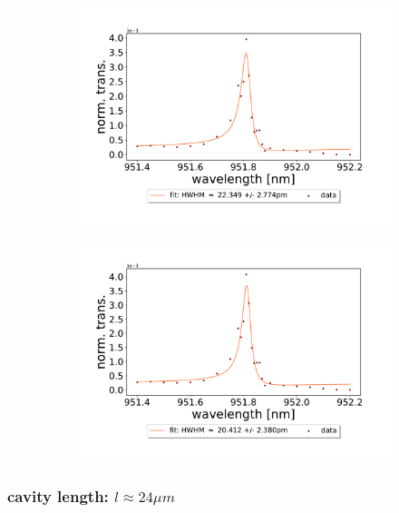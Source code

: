 \begin{figure}[h!]
\begin{subfigure}[b]{0.49\textwidth}
        \includegraphics[width=\textwidth]{figures/results/single fano fits/60um_M5_fit_3.pdf}
        \caption{}
        \label{fig:60um_M5_fit_3}
    \end{subfigure}
    \begin{subfigure}[b]{0.49\textwidth}
        \includegraphics[width=\textwidth]{figures/results/single fano fits/60um_M5_fit_4.pdf}
        \caption{}
        \label{fig:60um_M5_fit_4}
    \end{subfigure}
\end{figure}

\clearpage
\subsubsection*{cavity length: $l \approx 24 \mu m$}

